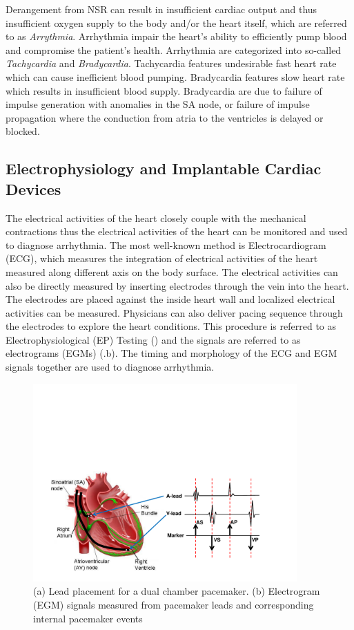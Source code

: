 Derangement from NSR can result in insufficient cardiac output and thus insufficient oxygen supply to the body and/or the heart itself, which are referred to as \emph{Arrythmia}. Arrhythmia impair the heart's ability to efficiently pump blood and compromise the patient's health. 
Arrhythmia are categorized into so-called \emph{Tachycardia} and \emph{Bradycardia}. Tachycardia features undesirable fast heart rate which can cause inefficient blood pumping. Bradycardia features slow heart rate which results in insufficient blood supply. Bradycardia are due to failure of impulse generation with anomalies in the SA node, or failure of impulse propagation where the conduction from atria to the ventricles is delayed or blocked. 
\subsection{Electrophysiology and Implantable Cardiac Devices}
\label{EP}
The electrical activities of the heart closely couple with the mechanical contractions thus the electrical activities of the heart can be monitored and used to diagnose arrhythmia. The most well-known method is Electrocardiogram (ECG), which measures the integration of electrical activities of the heart measured along different axis on the body surface. The electrical activities can also be directly measured by inserting electrodes through the vein into the heart. The electrodes are placed against the inside heart wall and localized electrical activities can be measured. Physicians can also deliver pacing sequence through the electrodes to explore the heart conditions. This procedure is referred to as Electrophysiological (EP) Testing  (\cite{josephson}) and the signals are referred to as electrograms (EGMs) (.b). The timing and morphology of the  ECG and EGM signals together are used to diagnose arrhythmia.
\begin{figure}[!t]
\centering
		\includegraphics[width=0.9\textwidth]{figs/egm.pdf}
		
\caption{\small (a) Lead placement for a dual chamber pacemaker. (b) Electrogram (EGM) signals measured from pacemaker leads and corresponding internal pacemaker events}
\label{fig:probes}
\end{figure} 

